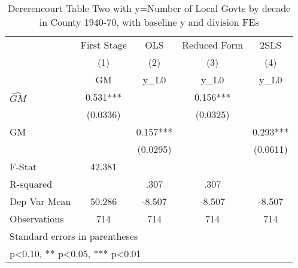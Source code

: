 \begin{table}[htbp]\centering
\def\sym#1{\ifmmode^{#1}\else\(^{#1}\)\fi}
\caption{Dererencourt Table Two with y=Number of Local Govts by decade in County 1940-70, with baseline y and division FEs}
\begin{tabular}{l*{4}{c}}
\toprule
                    & First Stage   &         OLS   &Reduced Form   &        2SLS   \\
                    &\multicolumn{1}{c}{(1)}&\multicolumn{1}{c}{(2)}&\multicolumn{1}{c}{(3)}&\multicolumn{1}{c}{(4)}\\
                    &\multicolumn{1}{c}{GM}&\multicolumn{1}{c}{y\_L0}&\multicolumn{1}{c}{y\_L0}&\multicolumn{1}{c}{y\_L0}\\
\midrule
$\hat{GM}$          &       0.531***&               &       0.156***&               \\
                    &    (0.0336)   &               &    (0.0325)   &               \\
\addlinespace
GM                  &               &       0.157***&               &       0.293***\\
                    &               &    (0.0295)   &               &    (0.0611)   \\
\midrule
F-Stat              &      42.381   &               &               &               \\
R-squared           &               &        .307   &        .307   &               \\
Dep Var Mean        &      50.286   &      -8.507   &      -8.507   &      -8.507   \\
Observations        &         714   &         714   &         714   &         714   \\
\bottomrule
\multicolumn{5}{l}{\footnotesize Standard errors in parentheses}\\
\multicolumn{5}{l}{\footnotesize * p<0.10, ** p<0.05, *** p<0.01}\\
\end{tabular}
\end{table}
